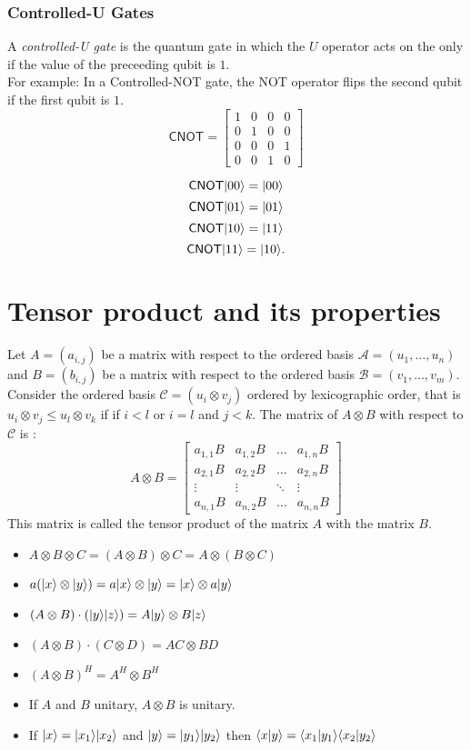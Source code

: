 \subsubsection*{Controlled-U Gates}
	A \emph{controlled-U gate} is the quantum gate in which the $U$ operator acts on the  only if the value of the preceeding qubit is $1$.\\ For example: In a Controlled-\textsf{NOT} gate, the \textsf{NOT} operator flips the second qubit if the first qubit is $1$.
	\[
	\textsf{CNOT} = \begin{bmatrix}
 1&0&0&0\\
0&1&0&0\\
0&0&0&1 \\
0&0&1&0\end{bmatrix}
	\]
	
	\[
	\textsf{CNOT}|00\rangle=|00\rangle
	\]
	\[
	\textsf{CNOT}|01\rangle=|01\rangle
	\]
	\[
	\textsf{CNOT}|10\rangle=|11\rangle
	\]
	\[
	\textsf{CNOT}|11\rangle=|10\rangle.
	\]
	
	
\section {Tensor product and its properties}

Let $A=(a_{i,j})$ be a matrix with respect to the ordered basis $\mathcal{A}=(u_1,\dots,u_n)$ and $B=(b_{i,j})$ be a matrix with respect to the ordered basis $\mathcal{B}=(v_1,\dots,v_m)$. Consider the ordered basis $\mathcal{C}=(u_i \otimes v_j)$ ordered by lexicographic order, that is $u_i \otimes v_j \leq u_l \otimes v_k$ if if $i<l$ or $i=l$ and $j<k$. The matrix of $A \otimes B$ with respect to $\mathcal{C}$ is : 
\[
	A \otimes B= 
	\begin{bmatrix}
 	a_{1,1}B & a_{1,2}B & \dots & a_{1,n}B\\
	a_{2,1}B & a_{2,2}B & \dots & a_{2,n}B\\
	\vdots & \vdots & \ddots & \vdots \\
	a_{n,1}B & a_{n,2}B & \dots & a_{n,n}B
	\end{bmatrix} 
\]
		This matrix is called the tensor product of the matrix $A$ with the matrix $B$.
\begin{itemize}
\item $A \otimes B \otimes C =  (A \otimes B ) \otimes C = A \otimes (B \otimes C)$
\item $ a ( |x\rangle \otimes |y\rangle) = a |x\rangle \otimes |y\rangle = |x\rangle \otimes a|y\rangle$
\item $ ( A \otimes B) \cdot (|y\rangle|z\rangle) = A|y\rangle \otimes B|z\rangle$
\item $ ( A \otimes B) \cdot ( C \otimes D) = AC \otimes BD$
\item $ (A \otimes B) ^{H} = A^{H} \otimes B^{H}$
\item If $ A$ and $B$ unitary, $A \otimes B$ is unitary.
\item If $|x\rangle=|x_1\rangle |x_2\rangle$ and $|y\rangle=|y_1\rangle|y_2\rangle$ then $\dotproduct[x,y]=\dotproduct[x_1,y_1] \dotproduct[x_2, y_2]$ 
\end{itemize}
